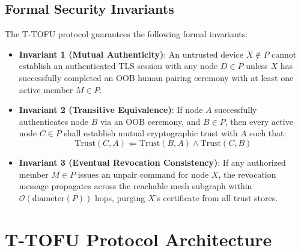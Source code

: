 \documentclass[conference,a4paper]{IEEEtran}
\begin{document}
\subsection{Formal Security Invariants}
The T-TOFU protocol guarantees the following formal invariants:
\begin{itemize}
    \item \textbf{Invariant 1 (Mutual Authenticity)}: An untrusted device $X \notin P$ cannot establish an authenticated TLS session with any node $D \in P$ unless $X$ has successfully completed an OOB human pairing ceremony with at least one active member $M \in P$.
    \item \textbf{Invariant 2 (Transitive Equivalence)}: If node $A$ successfully authenticates node $B$ via an OOB ceremony, and $B \in P$, then every active node $C \in P$ shall establish mutual cryptographic trust with $A$ such that:
    \begin{equation}
        \text{Trust}(C, A) \Leftarrow \text{Trust}(B, A) \wedge \text{Trust}(C, B)
    \end{equation}
    \item \textbf{Invariant 3 (Eventual Revocation Consistency)}: If any authorized member $M \in P$ issues an unpair command for node $X$, the revocation message propagates across the reachable mesh subgraph within $\mathcal{O}(\text{diameter}(P))$ hops, purging $X$'s certificate from all trust stores.
\end{itemize}

\section{T-TOFU Protocol Architecture}
\end{document}
